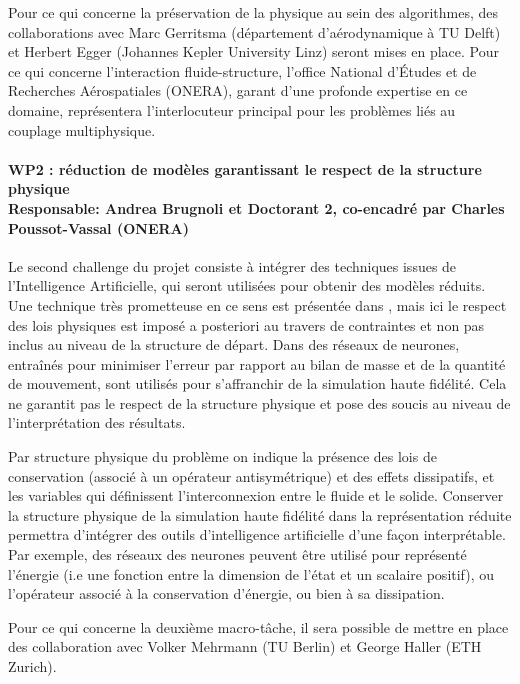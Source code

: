 \documentclass[12pt, french]{article}
\begin{document}
Pour ce qui concerne la préservation de la physique au sein des algorithmes, des collaborations avec Marc Gerritsma (département d'aérodynamique à TU Delft) et Herbert Egger (Johannes Kepler University Linz) seront mises en place. Pour ce qui concerne l'interaction fluide-structure, l'office National d'Études et de Recherches Aérospatiales (ONERA), garant d'une profonde expertise en ce domaine, représentera l'interlocuteur principal pour les problèmes liés au couplage multiphysique.

\paragraph{\large WP2 : réduction de modèles garantissant le respect de la structure physique\\
Responsable: Andrea Brugnoli et Doctorant 2, co-encadré par Charles Poussot-Vassal (ONERA)\\}

Le second challenge du projet consiste à intégrer des techniques issues de l'Intelligence
Artificielle, qui seront utilisées pour obtenir des modèles réduits. Une technique très prometteuse en ce sens est présentée dans \cite{lee2020}, mais ici le respect des lois physiques est imposé a posteriori au travers de contraintes et non pas inclus au niveau de la structure de départ. Dans \cite{sun2020physics} des réseaux de neurones, entraînés pour minimiser l'erreur par rapport au bilan de masse et de la quantité de mouvement, sont utilisés pour s'affranchir de la simulation haute fidélité. Cela ne garantit pas le respect de la structure physique et pose des soucis au niveau de l'interprétation des résultats.

Par structure physique du problème on indique la présence des lois de conservation (associé à un opérateur antisymétrique) et des effets dissipatifs, et les variables qui définissent l'interconnexion entre le fluide et le solide. Conserver la structure physique de la simulation haute fidélité dans la représentation réduite permettra d'intégrer des outils d'intelligence artificielle d'une façon interprétable. Par exemple, des réseaux des neurones peuvent être utilisé pour représenté l'énergie (i.e une fonction entre la dimension de l'état et un scalaire positif), ou l'opérateur associé à la conservation d'énergie, ou bien à sa dissipation. 

Pour ce qui concerne la deuxième macro-tâche, il sera possible de mettre en place des collaboration avec Volker Mehrmann (TU Berlin) et George Haller (ETH Zurich).
\end{document}
